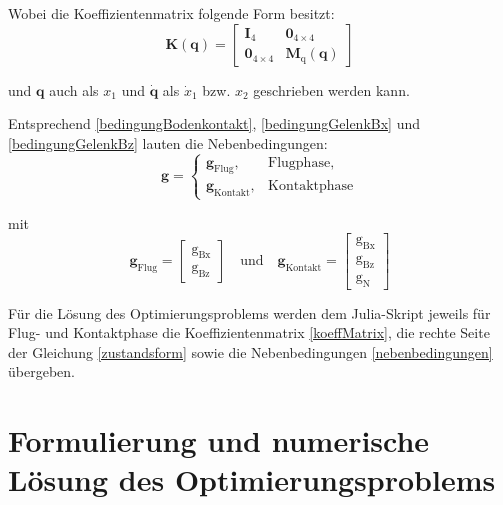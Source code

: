\documentclass[]{scrartcl}
\begin{document}
Wobei die Koeffizientenmatrix folgende Form besitzt:
\begin{equation}
	\mathbf{K(q)} =
	\begin{bmatrix}
		\mathbf{I}_4 & \mathbf{0}_{4 \times 4} \\
		\mathbf{0}_{4 \times 4} & \mathbf{M}_{\mathrm{q}}(\mathbf{q})
	\end{bmatrix}
	\label{koeffMatrix}
\end{equation}

und $\mathbf{q}$ auch als $x_1$ und $\dot{\mathbf{q}}$ als $\dot{x}_1$ bzw. $x_2$ geschrieben werden kann.

Entsprechend \eqref{bedingungBodenkontakt}, \eqref{bedingungGelenkBx} und \eqref{bedingungGelenkBz} lauten die Nebenbedingungen:
\begin{equation}
	\mathbf{g} = 
	\begin{cases}
		\mathbf{g}_{\mathrm{Flug}}
		, & \text{Flugphase}, \\
		\mathbf{g}_{\mathrm{Kontakt}}
		, & \text{Kontaktphase}
	\end{cases}
	\label{nebenbedingungen}
\end{equation}

mit
\begin{equation}
	\mathbf{g}_{\mathrm{Flug}} = \begin{bmatrix}
		\mathrm{g_{Bx}} \\
		\mathrm{g_{Bz}}
	\end{bmatrix}
	\quad \text{und} \quad
	\mathbf{g}_{\mathrm{Kontakt}} = \begin{bmatrix}
		\mathrm{g_{Bx}} \\
		\mathrm{g_{Bz}} \\
		\mathrm{g_{N}}
	\end{bmatrix}
\end{equation}


Für die Lösung des Optimierungsproblems werden dem Julia-Skript jeweils für Flug- und Kontaktphase die Koeffizientenmatrix \eqref{koeffMatrix}, die rechte Seite der Gleichung \eqref{zustandsform} sowie die Nebenbedingungen \eqref{nebenbedingungen} übergeben.

\section{Formulierung und numerische Lösung des Optimierungsproblems}
\end{document}
